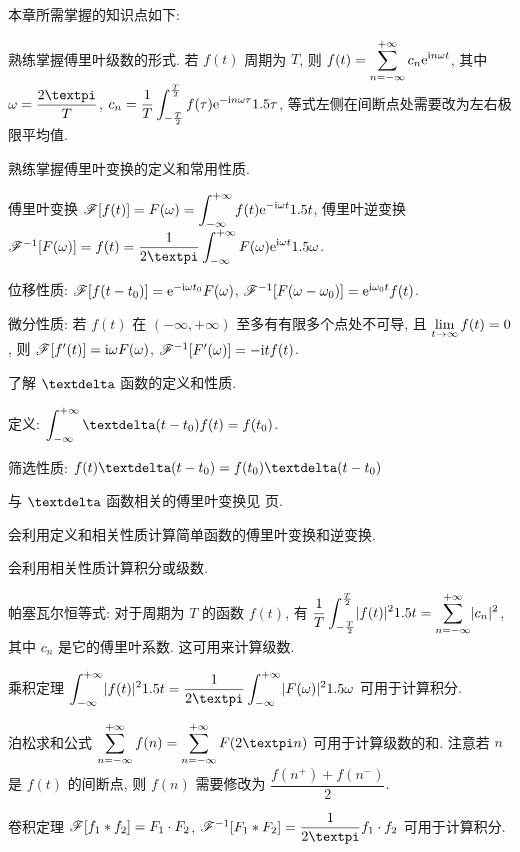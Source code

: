 本章所需掌握的知识点如下:
\begin{conclusion}
  \item 熟练掌握傅里叶级数的形式. 若 $f(t)$ 周期为 $T$, 则 $f(t)=\displaystyle\sum_{n=-\infty}^{+\infty} c_n \mathrm{e}^{\mathrm{i} n\omega t}$, 其中 $\omega=\dfrac{2\cpi}{T}$, $c_n=\dfrac 1T\displaystyle\int_{-\frac T2}^{\frac T2} f(\tau)\mathrm{e}^{-\mathrm{i} n\omega\tau} 1.5\tau$, 等式左侧在间断点处需要改为左右极限平均值.
  \item 熟练掌握傅里叶变换的定义和常用性质.
  \begin{conclusion}
    \item 傅里叶变换 $\mathscr{F}[f(t)]=F(\omega)=\displaystyle\int_{-\infty}^{+\infty} f(t) \mathrm{e}^{-\mathrm{i} \omega t} 1.5 t$, 傅里叶逆变换 $\msf^{-1}[F(\omega)]=f(t)=\dfrac1{2\cpi} \intff F(\omega) \ee^{\ii \omega t} \d\omega$.
    \item 位移性质: $\mathscr{F}[f(t-t_0)]=\mathrm{e}^{-\mathrm{i} \omega t_0}F(\omega)$, $\mathscr{F}^{-1}[F(\omega-\omega_0)]=\mathrm{e}^{\mathrm{i} \omega_0 t}f(t)$.
    \item 微分性质: 若 $f(t)$ 在 $(-\infty,+\infty)$ 至多有有限多个点处不可导, 且 $\lim\limits_{t\rightarrow\infty}f(t)=0$, 则 $\mathscr{F}[f'(t)]=\mathrm{i} \omega F(\omega)$, $\mathscr{F}^{-1}[F'(\omega)]=-\mathrm{i} tf(t)$.
  \end{conclusion}
  \item 了解 $\dirac$ 函数的定义和性质.
  \begin{conclusion}
    \item 定义: $\intff \dirac(t-t_0)f(t)=f(t_0)$.
    \item 筛选性质: $f(t)\dirac(t-t_0)=f(t_0)\dirac(t-t_0)$
    \item 与 $\dirac$ 函数相关的傅里叶变换见 \pageref{page:dirac-fourier-transform} 页.
  \end{conclusion}
  \item 会利用定义和相关性质计算简单函数的傅里叶变换和逆变换.
  \item 会利用相关性质计算积分或级数.
  \begin{conclusion}
    \item 帕塞瓦尔恒等式: 对于周期为 $T$ 的函数 $f(t)$, 有 $\dfrac1{T}\displaystyle\int_{-\frac T2}^{\frac T2} \lvert f(t)\rvert^21.5 t
    =\displaystyle\sum_{n=-\infty}^{+\infty} \lvert c_n\rvert^2$, 其中 $c_n$ 是它的傅里叶系数. 这可用来计算级数.
    \item 乘积定理 $\intff \abs{f(t)}^2\d t
    =\frac1{2\cpi}\intff \abs{F(\omega)}^2\d \omega$ 可用于计算积分.
    \item 泊松求和公式 $\sumff f(n)=\sumff F(2\cpi n)$ 可用于计算级数的和. 注意若 $n$ 是 $f(t)$ 的间断点, 则 $f(n)$ 需要修改为 $\dfrac{f(n^+)+f(n^-)}2$.
    \smallskip
    \item 卷积定理 $\mathscr{F}[f_1\ast f_2]=F_1\cdot F_2$, $\msf^{-1}[F_1\ast F_2]=\dfrac1{2\cpi}f_1\cdot f_2$ 可用于计算积分.

\end{conclusion}
\end{conclusion}
